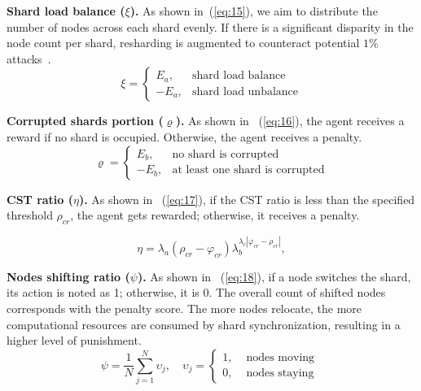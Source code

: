 \smallskip
\noindent\textbf{Shard load balance ($\xi$).}
As shown in~(\ref{eq:15}), we aim to distribute the number of nodes across each shard evenly. If there is a significant disparity in the node count per shard, resharding is augmented to counteract potential $1\%$ attacks~\cite{han2022analysing}.
\begin{equation}
    \label{eq:15}
    \xi=\left\{\begin{array}{ll}
    E_{a}, & \text {shard load balance}  \\
    -E_{a}, & \text {shard load unbalance}
\end{array}\right.
\end{equation}



\smallskip
\noindent\textbf{Corrupted shards portion ($\varrho$).}
As shown in ~(\ref{eq:16}), the agent receives a reward if no shard is occupied. Otherwise, the agent receives a penalty.
\begin{equation}
    \label{eq:16}
    \varrho=\left\{\begin{array}{ll}
    E_{b}, & \text {no shard is corrupted} \\
    -E_{b}, & \text {at least one shard is corrupted}
\end{array}\right.
\end{equation}



\smallskip
\noindent\textbf{CST ratio ($\eta$).}
As shown in ~(\ref{eq:17}), if the CST ratio is less than the specified threshold $\rho_{cr}$, the agent gets rewarded; otherwise, it receives a penalty.

\begin{equation}
    \label{eq:17}
    \eta= \lambda_a \left (\rho_{cr}-\varphi_{cr} \right ) \lambda_b^{\lambda_c \left | \varphi_{cr}- \rho_{cr} \right | },
\end{equation}

\smallskip
\noindent\textbf{Nodes shifting ratio ($\psi$).}
As shown in ~(\ref{eq:18}), if a node switches the shard, its action is noted as 1; otherwise, it is 0. The overall count of shifted nodes corresponds with the penalty score. The more nodes relocate, the more computational resources are consumed by shard synchronization, resulting in a higher level of punishment.
\begin{equation}
    \label{eq:18}
    \psi = \frac{1}{N} \sum_{j=1}^{N} \upsilon_{j}, \quad
    \upsilon_{j} =\left\{\begin{array}{ll}
    1, & \text { nodes moving } \\
    0, & \text { nodes staying }
    \end{array}\right.
\end{equation}

